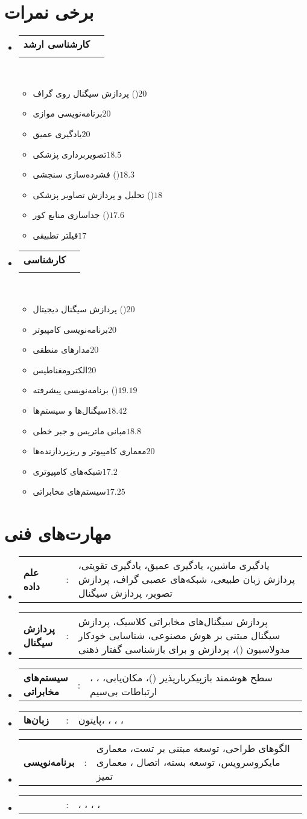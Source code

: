 \documentclass[a4paper,11pt]{article}
\makeatletter
\newcommand{\resumeItemScore}[2]{\item[]\small#1\hfill#2}
\newcommand{\resumeItemListStart}{\begin{itemize}[rightmargin=0.11in]}
\newcommand{\resumeItemListEnd}{\end{itemize}}
\newcommand{\resumeSectionType}[3]{
\item\begin{tabular*}{0.96\textwidth}[t]{
p{0.15\linewidth}p{0.02\linewidth}p{0.81\linewidth}
}
\textbf{#1} & #2 & #3
\end{tabular*}\vspace{-2pt}
}
\newcommand{\resumeQuadHeading}[4]{
\item
\begin{tabular*}{0.96\textwidth}[t]{r@{\extracolsep{\fill}}l}
\textbf{#1} & #2 \\
\textit{\small#3} & \textit{\small #4} \\
\end{tabular*}
}
\newcommand{\resumeHeadingListStart}{
\begin{itemize}[rightmargin=0.15in, label={}]
}
\newcommand{\resumeHeadingListEnd}{\end{itemize}}
\makeatother
\begin{document}
\section{برخی نمرات}
\resumeHeadingListStart{}
\resumeQuadHeading{کارشناسی ارشد}{}{}{}\\\vspace{-1.5em}

\begin{multicols}{2}
\resumeItemListStart{}
\resumeItemScore{پردازش سیگنال روی گراف ()}{$20$}
\resumeItemScore{برنامه‌نویسی موازی}{$20$}
\resumeItemScore{یادگیری عمیق}{$20$}
\resumeItemScore{تصویربرداری پزشکی}{$18.5$}
\resumeItemScore{فشرده‌سازی سنجشی ()}{$18.3$}
\resumeItemScore{تحلیل و پردازش تصاویر پزشکی ()}{$18$}
\resumeItemScore{جداسازی منابع کور ()}{$17.6$}
\resumeItemScore{فیلتر تطبیقی}{$17$}
\resumeItemListEnd{}
\end{multicols}

\resumeQuadHeading{کارشناسی}{}{}{}\\\vspace{-1.5em}
\begin{multicols}{2}
\resumeItemListStart{}
\resumeItemScore{پردازش سیگنال دیجیتال ()}{$20$}
\resumeItemScore{برنامه‌نویسی کامپیوتر}{$20$}
\resumeItemScore{مدارهای منطقی}{$20$}
\resumeItemScore{الکترومغناطیس}{$20$}
\resumeItemScore{برنامه‌نویسی پیشرفته ()}{$19.19$}
\resumeItemScore{سیگنال‌ها و سیستم‌ها}{$18.42$}
\resumeItemScore{مبانی ماتریس و جبر خطی}{$18.8$}
\resumeItemScore{معماری کامپیوتر و ریزپردازنده‌ها}{$20$}
\resumeItemScore{شبکه‌های کامپیوتری}{$17.2$}
\resumeItemScore{سیستم‌های مخابراتی}{$17.25$}
\resumeItemListEnd{}
\end{multicols}

\resumeHeadingListEnd{}


\section{مهارت‌های فنی}
\resumeHeadingListStart{}
\resumeSectionType{علم داده}{:}{یادگیری ماشین، یادگیری عمیق، یادگیری تقویتی، پردازش زبان طبیعی، شبکه‌های عصبی گراف، پردازش تصویر، پردازش سیگنال}
\resumeSectionType{پردازش سیگنال}{:}{پردازش سیگنال‌های مخابراتی کلاسیک، پردازش سیگنال مبتنی بر هوش مصنوعی، شناسایی خودکار مدولاسیون (\lr{AMR})، پردازش \lr{EEG} و \lr{stereo-EEG} برای بازشناسی گفتار ذهنی}
\resumeSectionType{سیستم‌های مخابراتی}{:}{\lr{5G}، \lr{6G}، سطح هوشمند بازپیکربارپذیر (\lr{RIS})، مکان‌یابی، ارتباطات بی‌سیم}
\resumeSectionType{زبان‌ها}{:}{پایتون، \lr{C++}، \lr{Cuda}، \lr{Matlab}، \lr{JavaScript}}
\resumeSectionType{برنامه‌نویسی}{:}{الگوهای طراحی، توسعه مبتنی بر تست، معماری مایکروسرویس، توسعه بسته، اتصال \lr{CPython}، معماری تمیز}
\resumeSectionType{\lr{devops}}{:}{\lr{git}، \lr{CI/CD}، \lr{gitlab-ci}، \lr{github actions}، \lr{template repo}}
\resumeHeadingListEnd{}
\end{document}
